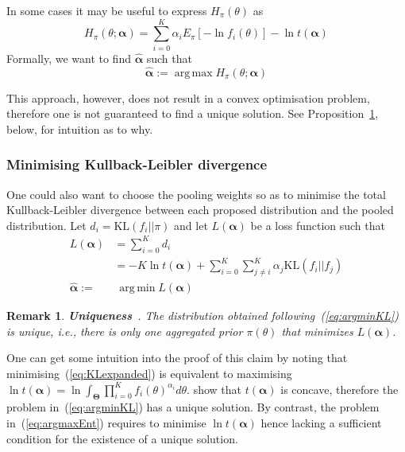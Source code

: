 \documentclass[a4paper, notitlepage, 10pt]{article}
\DeclareMathOperator*{\argmin}{arg\,min}
\DeclareMathOperator*{\argmax}{arg\,max}
\newtheorem{remark}{Remark}[]
\begin{document}
In some cases it may be useful to express $H_{\pi}(\theta)$ as
\begin{equation}
\label{eq:entropypiB}
 H_{\pi}(\theta; \boldsymbol\alpha) = \sum_{i=0}^{K} \alpha_i E_{\pi}[ - \ln f_i(\theta)] - \ln t(\boldsymbol\alpha)
\end{equation}
Formally, we want to find $\hat{\boldsymbol\alpha}$ such that
\begin{equation}
\label{eq:argmaxEnt}
 \hat{\boldsymbol\alpha}:= \argmax H_{\pi}(\theta; \boldsymbol\alpha)  
\end{equation}

This approach, however, does not result in a convex optimisation problem, therefore one is not guaranteed to find a unique solution. 
See Proposition~\ref{remark:uniqueness}, below, for intuition as to why.

\subsubsection*{Minimising Kullback-Leibler divergence}

One could also want to choose the pooling weights so as to minimise the total Kullback-Leibler divergence between each proposed distribution and the pooled distribution.
Let $d_i = \text{KL}(f_i || \pi)$ and let $L(\boldsymbol\alpha)$ be a loss function such that
\begin{align}
L(\boldsymbol\alpha) &= \sum_{i=0}^Kd_i \\
\label{eq:KLexpanded}
     &= -K\ln t(\boldsymbol\alpha) + \sum_{i=0}^K\sum_{j\neq i}^K\alpha_j\text{KL}(f_i||f_j) \\
     \label{eq:argminKL}
     \hat{\boldsymbol\alpha}:=& \:\argmin L(\boldsymbol\alpha)   
\end{align}

\begin{remark}
\label{remark:uniqueness}
\textbf{Uniqueness}~\citep{rufo2012A}.
 The distribution obtained following~(\ref{eq:argminKL}) is unique, i.e., there is only one aggregated prior $\pi(\theta)$ that minimizes $L(\boldsymbol\alpha)$.
\end{remark}
One can get some intuition into the proof  of this claim by noting that minimising~(\ref{eq:KLexpanded}) is equivalent to maximising $\ln t(\boldsymbol\alpha) = \ln\int_{\boldsymbol\Theta}\prod_{i=0}^{K}f_i(\theta)^{\alpha_i}d\theta$. 
\cite{rufo2012A} show that $t(\boldsymbol\alpha)$ is concave, therefore the problem in~(\ref{eq:argminKL}) has a unique solution.
By contrast, the problem in~(\ref{eq:argmaxEnt}) requires to minimise $\ln t(\boldsymbol\alpha)$ hence lacking a sufficient condition for the existence of a unique solution.
\end{document}

